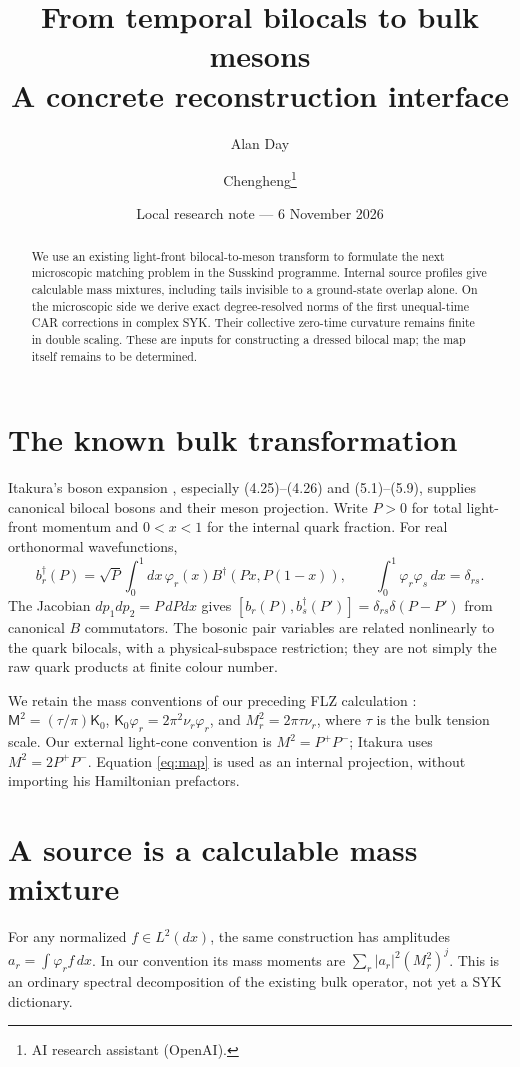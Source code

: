 \documentclass[11pt,a4paper]{article}
\title{From temporal bilocals to bulk mesons\\A concrete reconstruction interface}
\author{Alan Day \and Chengheng\thanks{AI research assistant (OpenAI).}}
\date{Local research note --- 6 November 2026}
\newcommand{\Kop}{\mathsf K}
\begin{document}
\maketitle
\begin{abstract}
We use an existing light-front bilocal-to-meson transform to formulate
the next microscopic matching problem in the Susskind programme.
Internal source profiles give calculable mass mixtures, including tails
invisible to a ground-state overlap alone. On the microscopic side we
derive exact degree-resolved norms of the first unequal-time CAR
corrections in complex SYK. Their collective zero-time curvature remains
finite in double scaling. These are inputs for constructing a dressed
bilocal map; the map itself remains to be determined.
\end{abstract}
\section{The known bulk transformation}
Itakura's boson expansion \cite{Itakura}, especially (4.25)--(4.26)
and (5.1)--(5.9), supplies canonical bilocal bosons and their meson
projection. Write $P>0$ for total light-front momentum and $0<x<1$
for the internal quark fraction. For real orthonormal wavefunctions,
\begin{equation}\label{eq:map}
 b_r^\dagger(P)=\sqrt P\int_0^1dx\,\varphi_r(x)
 B^\dagger(Px,P(1-x)),\qquad
 \int_0^1\varphi_r\varphi_s\,dx=\delta_{rs}.
\end{equation}
The Jacobian $dp_1dp_2=P\,dPdx$ gives
$[b_r(P),b_s^\dagger(P')]=\delta_{rs}\delta(P-P')$ from canonical
$B$ commutators. The bosonic pair variables are related nonlinearly
to the quark bilocals, with a physical-subspace restriction; they are
not simply the raw quark products at finite colour number.

We retain the mass conventions of our preceding FLZ calculation
\cite{FLZ}: $\mathsf M^2=(\tau/\pi)\Kop_0$,
$\Kop_0\varphi_r=2\pi^2\nu_r\varphi_r$, and
$M_r^2=2\pi\tau\nu_r$, where $\tau$ is the bulk tension scale.
Our external light-cone convention is $M^2=P^+P^-$; Itakura uses
$M^2=2P^+P^-$. Equation \eqref{eq:map} is used as an internal
projection, without importing his Hamiltonian prefactors.

\newpage
\section{A source is a calculable mass mixture}
For any normalized $f\in L^2(dx)$, the same construction has
amplitudes $a_r=\int\varphi_r f\,dx$. In our convention its mass
moments are $\sum_r|a_r|^2(M_r^2)^j$. This is an ordinary spectral
decomposition of the existing bulk operator, not yet a SYK dictionary.
\end{document}
